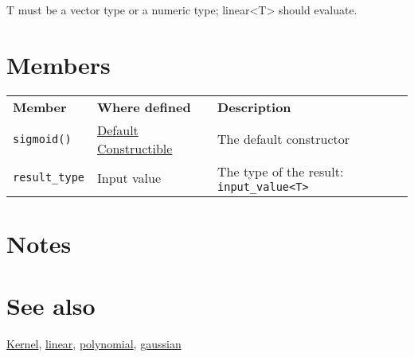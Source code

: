 \documentclass{article}
\begin{document}
T must be a vector type or a numeric type; linear<T> should evaluate.


\section*{Members}

\begin{tabular}{lll}
\textbf{Member} & \textbf{Where defined} & \textbf{Description} \\ 
\texttt{sigmoid()} & \href{http://www.sgi.com/tech/stl/DefaultConstructible.html}{Default Constructible} & The default constructor \\
\texttt{result_type} & Input value & The type of the result: \texttt{input_value<T>} \\
\end{tabular}

\section*{Notes}

\section*{See also}

\href{research/kml/documentation/kernel.html}{Kernel},
\href{research/kml/documentation/linear.html}{linear}, 
\href{research/kml/documentation/polynomial.html}{polynomial}, 
\href{research/kml/documentation/gaussian.html}{gaussian}



\end{document}
